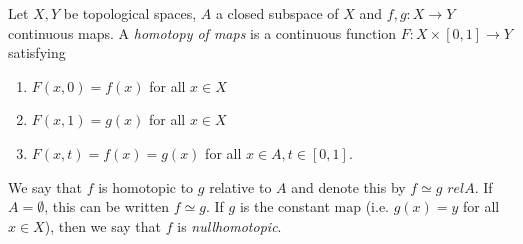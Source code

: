 \documentclass{article}
\begin{document}
Let $X,Y$ be topological spaces, $A$ a closed subspace of $X$ and $f,g:X \to Y$ continuous maps. A \emph{homotopy of maps} is a continuous function $F:X \times [0,1] \to Y$ satisfying
\begin{enumerate}
\item $F(x,0)=f(x)$ for all $x \in X$
\item $F(x,1)=g(x)$ for all $x \in X$
\item $F(x,t)=f(x)=g(x)$ for all $x \in A, t\in [0,1]$.
\end{enumerate}
We say that $f$ is homotopic to $g$ relative to $A$ and denote this by $f \simeq g$ $rel A$. If $A=\emptyset$, this can be written $f \simeq g$. If $g$ is the constant map (i.e. $g(x)=y$  for all $x \in X$), then we say that $f$ is \emph{nullhomotopic}.
\end{document}
